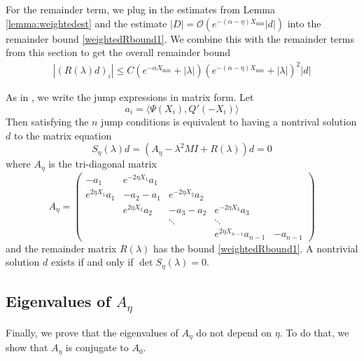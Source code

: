\documentclass[thesis.tex]{subfiles}
\begin{document}
For the remainder term, we plug in the estimates from  Lemma \ref{lemma:weightedest} and the estimate $|D| = \mathcal{O}(e^{-(\alpha - \eta)X_{\min}}|d|)$ into the remainder bound \cref{weightedRbound1}. We combine this with the remainder terms from this section to get the overall remainder bound
\begin{align}\label{weightedRbound1}
|(R(\lambda)d)_i| \leq C \left( e^{-\alpha X_{\min}} + |\lambda|\right) \left( e^{-(\alpha - \eta)X_{\min}} + |\lambda|  \right)^2 |d|
\end{align}

As in \cite{Sandstede1998}, we write the jump expressions in matrix form. Let 
\[
a_i = \langle \Psi(X_i), Q'(-X_i) \rangle
\]
Then satisfying the $n$ jump conditions is equivalent to having a nontrival solution $d$ to the matrix equation
\[
S_\eta(\lambda)d = (A_\eta - \lambda^2 M I + R(\lambda))d = 0
\]
where $A_\eta$ is the tri-diagonal matrix
\[
A_\eta = \begin{pmatrix}
-a_1 & e^{-2 \eta X_1} a_1 \\
e^{2 \eta X_1} a_1 & -a_2 - a_1 & e^{-2 \eta X_2} a_2 \\
& e^{2 \eta X_2} a_2 & -a_3 - a_2 & e^{-2 \eta X_3} a_3 \\
&& \ddots & \ddots \\
& & & e^{2 \eta X_{n-1}} a_{n-1} & -a_{n-1} 
\end{pmatrix}
\]
and the remainder matrix $R(\lambda)$ has the bound \cref{weightedRbound1}. A nontrivial solution $d$ exists if and only if $\det S_\eta(\lambda) = 0$.

\subsection{Eigenvalues of $A_\eta$}
Finally, we prove that the eigenvalues of $A_\eta$ do not depend on $\eta$. To do that, we show that $A_\eta$ is conjugate to $A_0$.
\end{document}
